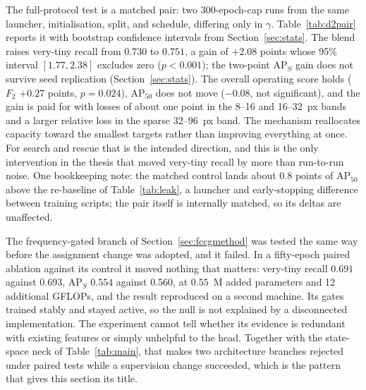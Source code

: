 \documentclass[12pt,a4paper,oneside]{report}
\begin{document}
The full-protocol test is a matched pair: two 300-epoch-cap runs
from the same launcher, initialisation, split, and schedule, differing only in
$\gamma$. Table~\ref{tab:d2pair} reports it with bootstrap confidence
intervals from Section~\ref{sec:stats}. The blend raises very-tiny
recall from $0.730$ to $0.751$, a gain of $\mathbf{+2.08}$ points whose 95\%
interval $[1.77, 2.38]$ excludes zero ($p<0.001$); the two-point
$\mathrm{AP}_S$ gain does not survive seed replication
(Section~\ref{sec:stats}). The overall operating score
holds ($F_2$ $+0.27$ points, $p=0.024$), $\mathrm{AP}_{50}$ does not move
($-0.08$, not significant), and the gain is paid for with losses of about one
point in the 8--16 and 16--32~px bands and a larger relative loss in the
sparse 32--96~px band. The mechanism reallocates capacity toward the smallest
targets rather than improving everything at once. For search and rescue that
is the intended direction, and this is the only intervention in the thesis
that moved very-tiny recall by more than run-to-run noise. One bookkeeping note: the
matched control lands about $0.8$ points of $\mathrm{AP}_{50}$ above the
re-baseline of Table~\ref{tab:leak}, a launcher and early-stopping difference
between training scripts; the pair itself is internally matched, so its deltas
are unaffected.

The frequency-gated branch of Section~\ref{sec:fccgmethod} was tested the same
way before the assignment change was adopted, and it failed. In a fifty-epoch
paired ablation against its control it moved nothing that matters: very-tiny
recall $0.691$ against $0.693$, $\mathrm{AP}_S$ $0.554$ against $0.560$, at
$0.55$~M added parameters and 12 additional GFLOPs, and the result reproduced
on a second machine. Its gates trained stably and stayed active, so the null is
not explained by a disconnected implementation. The experiment cannot tell
whether its evidence is redundant with existing features or simply unhelpful
to the head. Together with the state-space neck of
Table~\ref{tab:main}, that makes two architecture branches rejected under
paired tests while a supervision change succeeded, which is the pattern that
gives this section its title.
\end{document}
